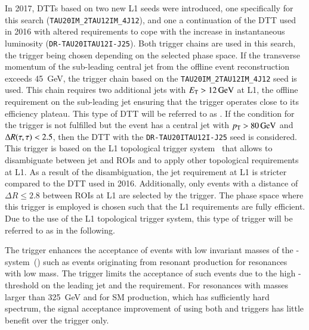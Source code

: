 In 2017, DTTs based on two new L1 seeds were introduced, one
specifically for this search (\texttt{TAU20IM\_2TAU12IM\_4J12}), and
one a continuation of the DTT used in 2016 with altered requirements
to cope with the increase in instantaneous luminosity
(\texttt{DR-TAU20ITAU12I-J25}). Both trigger chains are used in this
search, the trigger being chosen depending on the selected phase
space. If the transverse momentum of the sub-leading central jet from
the offline event reconstruction exceeds \SI{45}{\GeV}, the trigger
chain based on the \texttt{TAU20IM\_2TAU12IM\_4J12} seed is used. This
chain requires two additional jets with $\ET > \SI{12}{\GeV}$ at L1,
the offline requirement on the sub-leading jet \pT ensuring that the
trigger operates close to its efficiency plateau. This type of DTT
will be referred to as \FourJTwelve. If the condition for the
\FourJTwelve trigger is not fulfilled but the event has a central jet
with $\pT > \SI{80}{\GeV}$ and $\Delta R(\tau, \tau) < 2.5$, then the DTT with
the \texttt{DR-TAU20ITAU12I-J25} seed is considered. This trigger is
based on the L1 topological trigger system~\cite{TRIG-2019-02} that
allows to disambiguate between jet and \tauhadvis ROIs and to apply
other topological requirements at L1. As a result of the
disambiguation, the jet requirement at L1 is stricter compared to the
DTT used in 2016. Additionally, only events with a distance of
$\Delta R \leq \num{2.8}$ between \tauhadvis ROIs at L1 are selected
by the trigger. The phase space where this trigger is employed is
chosen such that the L1 requirements are fully efficient. Due to the
use of the L1 topological trigger system, this type of trigger will be
referred to as \LOneTopo in the following.

The \FourJTwelve trigger enhances the acceptance of events with low
invariant masses of the \HH-system~(\mHH) such as events originating
from resonant \HH production for resonances with low mass. The
\LOneTopo trigger limits the acceptance of such events due to the high
\pT-threshold on the leading jet and the \dRtautau requirement. For
resonances with masses larger than \SI{325}{\GeV} and for SM \HH
production, which has sufficiently hard \mHH spectrum, the signal
acceptance improvement of using both \FourJTwelve and \LOneTopo
triggers has little benefit over the \LOneTopo trigger only.

